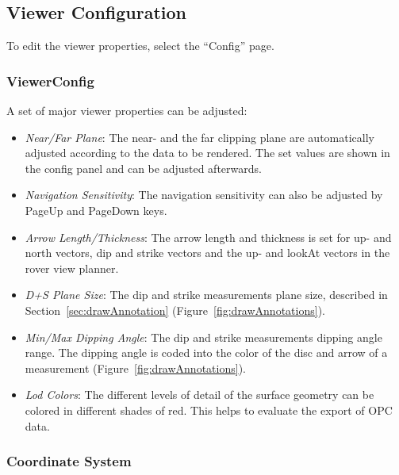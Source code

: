\subsection{Viewer Configuration}
\label{sec:config}

To edit the viewer properties, select the ``Config'' page.

\subsubsection{ViewerConfig} 

A set of major viewer properties can be adjusted:
\begin{itemize}
	\item \textit{Near/Far Plane}: The near- and the far clipping plane are automatically adjusted according to the data to be rendered. The set values are shown in the config panel and can be adjusted afterwards. 
	\item \textit{Navigation Sensitivity}: The navigation sensitivity can also be adjusted by PageUp and PageDown keys. 
	\item \textit{Arrow Length/Thickness}: The arrow length and thickness is set for up- and north vectors, dip and strike vectors and the up- and lookAt vectors in the rover view planner. 
	\item \textit{D+S Plane Size}: The dip and strike measurements plane size, described in Section~\ref{sec:drawAnnotation}
 (Figure~\ref{fig:drawAnnotations}).
	\item \textit{Min/Max Dipping Angle}: The dip and strike measurements dipping angle range. The dipping angle is coded into the color of the disc and arrow of a measurement (Figure~\ref{fig:drawAnnotations}).
	\item \textit{Lod Colors}: The different levels of detail of the surface geometry can be colored in different shades of red.
			This helps to evaluate the export of OPC data.
\end{itemize}

\subsubsection{Coordinate System} 

